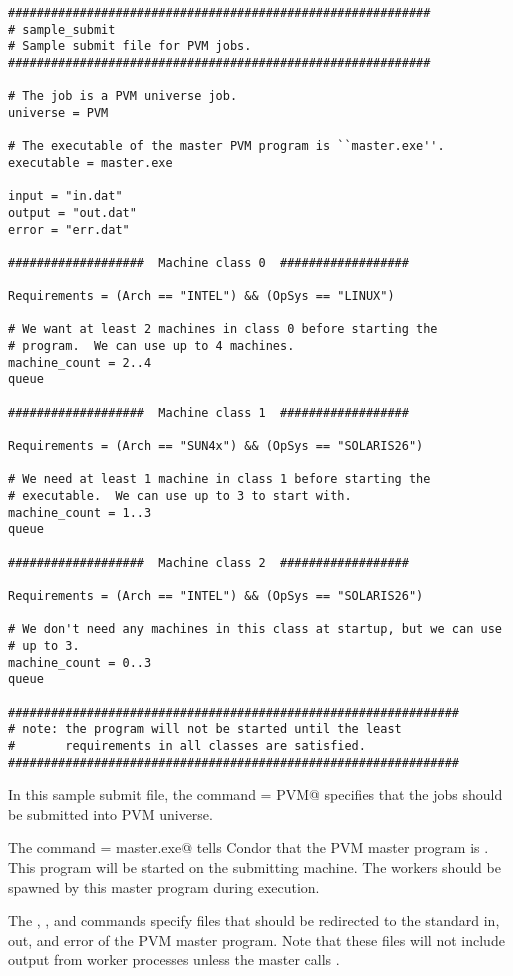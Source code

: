 \footnotesize
\begin{verbatim}
###########################################################
# sample_submit
# Sample submit file for PVM jobs. 
###########################################################

# The job is a PVM universe job.
universe = PVM  

# The executable of the master PVM program is ``master.exe''.
executable = master.exe

input = "in.dat"
output = "out.dat"
error = "err.dat"

###################  Machine class 0  ##################

Requirements = (Arch == "INTEL") && (OpSys == "LINUX") 

# We want at least 2 machines in class 0 before starting the 
# program.  We can use up to 4 machines.
machine_count = 2..4  
queue

###################  Machine class 1  ##################

Requirements = (Arch == "SUN4x") && (OpSys == "SOLARIS26") 

# We need at least 1 machine in class 1 before starting the 
# executable.  We can use up to 3 to start with.
machine_count = 1..3
queue

###################  Machine class 2  ##################

Requirements = (Arch == "INTEL") && (OpSys == "SOLARIS26") 

# We don't need any machines in this class at startup, but we can use
# up to 3. 
machine_count = 0..3
queue

###############################################################
# note: the program will not be started until the least 
#       requirements in all classes are satisfied.
###############################################################
\end{verbatim}
\normalsize

In this sample submit file, the command \verb@universe = PVM@
specifies that the jobs should be submitted into PVM universe.

The command \verb@executable = master.exe@ tells Condor that the PVM
master program is .  This program will be started on
the submitting machine.  The workers should be spawned by this master
program during execution.

The \verb@input@, \verb@output@, and \verb@error@ commands specify
files that should be redirected to the standard in, out, and error of
the PVM master program.  Note that these files will not include output
from worker processes unless the master calls .

